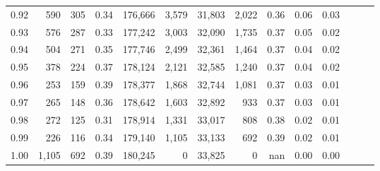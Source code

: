 \begin{tabular}{rrrrrrrrrrrrrr}
0.92 &    590 &  305 &  0.34 &  176,666 &    3,579 &  31,803 &   2,022 &  0.36 &  0.06 &      0.03 \\
0.93 &    576 &  287 &  0.33 &  177,242 &    3,003 &  32,090 &   1,735 &  0.37 &  0.05 &      0.02 \\
0.94 &    504 &  271 &  0.35 &  177,746 &    2,499 &  32,361 &   1,464 &  0.37 &  0.04 &      0.02 \\
0.95 &    378 &  224 &  0.37 &  178,124 &    2,121 &  32,585 &   1,240 &  0.37 &  0.04 &      0.02 \\
0.96 &    253 &  159 &  0.39 &  178,377 &    1,868 &  32,744 &   1,081 &  0.37 &  0.03 &      0.01 \\
0.97 &    265 &  148 &  0.36 &  178,642 &    1,603 &  32,892 &     933 &  0.37 &  0.03 &      0.01 \\
0.98 &    272 &  125 &  0.31 &  178,914 &    1,331 &  33,017 &     808 &  0.38 &  0.02 &      0.01 \\
0.99 &    226 &  116 &  0.34 &  179,140 &    1,105 &  33,133 &     692 &  0.39 &  0.02 &      0.01 \\
1.00 &  1,105 &  692 &  0.39 &  180,245 &        0 &  33,825 &       0 &   nan &  0.00 &      0.00 \\
\bottomrule
\end{tabular}
